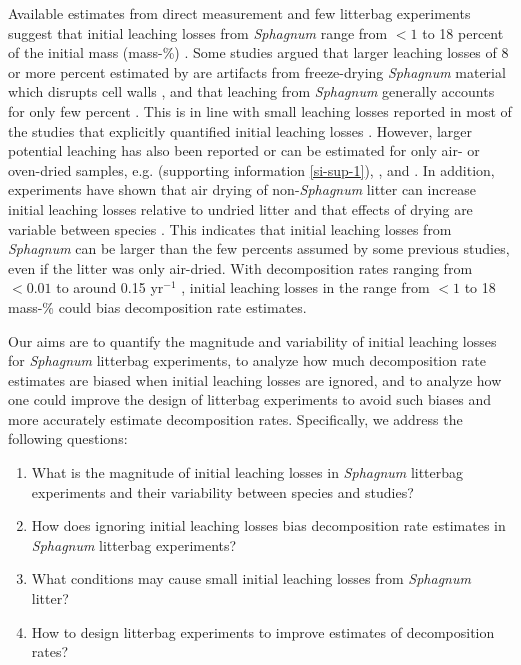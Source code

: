 \documentclass[bg, manuscript]{copernicus}
\begin{document}
Available estimates from direct measurement and few litterbag experiments suggest that initial leaching losses from \emph{Sphagnum} range from \(<1\) to 18 percent of the initial mass (mass-\%) \citep{Coulson.1978, Scheffer.2001, Moore.2001, Thormann.2002, Limpens.2003, Castells.2005, Moore.2007, DelGiudice.2017, Mastny.2018, Muller.2023}. Some studies argued that larger leaching losses of 8 or more percent estimated by \citet{Scheffer.2001} are artifacts from freeze-drying \emph{Sphagnum} material which disrupts cell walls \citep{Limpens.2003}, and that leaching from \emph{Sphagnum} generally accounts for only few percent \citep{Johnson.1991}. This is in line with small leaching losses reported in most of the studies that explicitly quantified initial leaching losses \citep{Coulson.1978, Moore.2001, Thormann.2002, Limpens.2003, Castells.2005, Mastny.2018}. However, larger potential leaching has also been reported or can be estimated for only air- or oven-dried samples, e.g. \citet{Moore.2007} (supporting information \ref{si-sup-1}), \citet{Thormann.2001}, and \citet{Muller.2023}. In addition, experiments have shown that air drying of non-\emph{Sphagnum} litter can increase initial leaching losses relative to undried litter \citep{Gessner.1989, Barlocher.1997} and that effects of drying are variable between species \citep{Taylor.1996}. This indicates that initial leaching losses from \emph{Sphagnum} can be larger than the few percents assumed by some previous studies, even if the litter was only air-dried. With decomposition rates ranging from \(<0.01\) to around 0.15 yr\(^{-1}\) \citep[e.g.,][]{Moore.2007, Turetsky.2008}, initial leaching losses in the range from \(<1\) to 18 mass-\% could bias decomposition rate estimates.

Our aims are to quantify the magnitude and variability of initial leaching losses for \emph{Sphagnum} litterbag experiments, to analyze how much decomposition rate estimates are biased when initial leaching losses are ignored, and to analyze how one could improve the design of litterbag experiments to avoid such biases and more accurately estimate decomposition rates. Specifically, we address the following questions:

\begin{enumerate}
\def\labelenumi{\arabic{enumi}.}
\item
  What is the magnitude of initial leaching losses in \emph{Sphagnum} litterbag experiments and their variability between species and studies?
\item
  How does ignoring initial leaching losses bias decomposition rate estimates in \emph{Sphagnum} litterbag experiments?
\item
  What conditions may cause small initial leaching losses from \emph{Sphagnum} litter?
\item
  How to design litterbag experiments to improve estimates of decomposition rates?
\end{enumerate}
\end{document}
